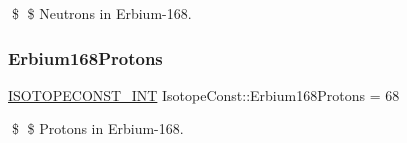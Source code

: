 \$ \$ Neutrons in Erbium-\/168. \mbox{\label{group___isotope_const-_erbium-_er168_ga01b7894445ba2b49ffcc58c525d5a38a}} 
\subsubsection{\texorpdfstring{Erbium168\+Protons}{Erbium168Protons}}
{\footnotesize\ttfamily \mbox{\hyperlink{group___isotope_const-_macros_ga5f18360b3e99483a35c32d789e62621c}{I\+S\+O\+T\+O\+P\+E\+C\+O\+N\+S\+T\+\_\+\+I\+NT}} Isotope\+Const\+::\+Erbium168\+Protons = 68}

\$ \$ Protons in Erbium-\/168. 